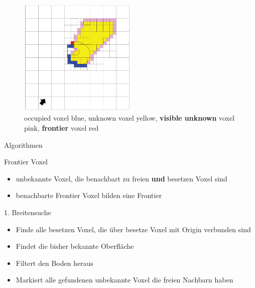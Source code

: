 \documentclass{beamer}
\begin{document}
\begin{frame}{}
	\centering
	\begin{figure}
		\includegraphics[width=0.5\textwidth]{Graphics/vasquez.png}
		\caption{occupied voxel blue, unknown voxel yellow, \textbf{visible unknown} voxel pink, \textbf{frontier} voxel red \cite{vasquez-gomez_vpl_2020}}
	\end{figure}
\end{frame}

\begin{frame}{Algorithmen}
	\begin{exampleblock}{Frontier Voxel}
		\begin{itemize}
			\item unbekannte Voxel, die benachbart zu freien \textbf{und} besetzen Voxel sind
			\item benachbarte Frontier Voxel bilden eine Frontier
		\end{itemize}
	\end{exampleblock}

	\begin{block}{1. Breitensuche}
		\begin{itemize}
			\item Finde alle besetzen Voxel, die über besetze Voxel mit Origin verbunden sind
			\item Findet die bisher bekannte Oberfläche
			\item Filtert den Boden heraus
			\item Markiert alle gefundenen unbekannte Voxel die freien Nachbarn haben
		\end{itemize}
	\end{block}
\end{frame}
\end{document}
